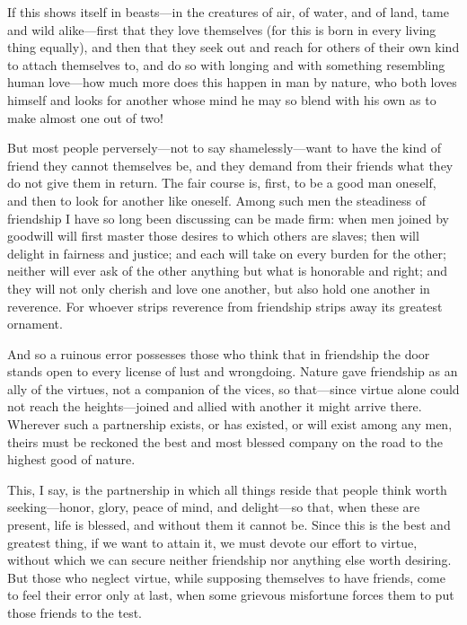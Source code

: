  If this shows itself in beasts—in the creatures of air, of water, and of land, tame and wild alike—first that they love themselves (for this is born in every living thing equally), and then that they seek out and reach for others of their own kind to attach themselves to, and do so with longing and with something resembling human love—how much more does this happen in man by nature, who both loves himself and looks for another whose mind he may so blend with his own as to make almost one out of two!

 But most people perversely—not to say shamelessly—want to have the kind of friend they cannot themselves be, and they demand from their friends what they do not give them in return. The fair course is, first, to be a good man oneself, and then to look for another like oneself. Among such men the steadiness of friendship I have so long been discussing can be made firm: when men joined by goodwill will first master those desires to which others are slaves; then will delight in fairness and justice; and each will take on every burden for the other; neither will ever ask of the other anything but what is honorable and right; and they will not only cherish and love one another, but also hold one another in reverence. For whoever strips reverence from friendship strips away its greatest ornament.

 And so a ruinous error possesses those who think that in friendship the door stands open to every license of lust and wrongdoing. Nature gave friendship as an ally of the virtues, not a companion of the vices, so that—since virtue alone could not reach the heights—joined and allied with another it might arrive there. Wherever such a partnership exists, or has existed, or will exist among any men, theirs must be reckoned the best and most blessed company on the road to the highest good of nature.

 This, I say, is the partnership in which all things reside that people think worth seeking—honor, glory, peace of mind, and delight—so that, when these are present, life is blessed, and without them it cannot be. Since this is the best and greatest thing, if we want to attain it, we must devote our effort to virtue, without which we can secure neither friendship nor anything else worth desiring. But those who neglect virtue, while supposing themselves to have friends, come to feel their error only at last, when some grievous misfortune forces them to put those friends to the test.

